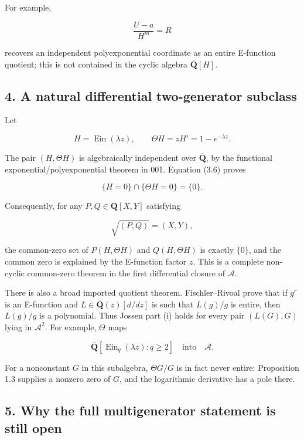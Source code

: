 \documentclass[11pt]{article}
\theoremstyle{keio}
\theoremstyle{definition}
\theoremstyle{remark}
\begin{document}
For example,

\[
  \frac{U-a}{H^m}=R
\]

recovers an independent polyexponential coordinate as an entire E-function
quotient; this is not contained in the cyclic algebra
\(\overline{\mathbf Q}[H]\).

\subsection{4. A natural differential two-generator subclass}

Let

\[
  H=\operatorname{Ein}(\lambda z),\qquad
  \Theta H=zH'=1-e^{-\lambda z}.
\]

The pair \((H,\Theta H)\) is algebraically independent over
\(\overline{\mathbf Q}\), by the functional exponential/polyexponential
theorem in 001. Equation (3.6) proves

\[
  \{H=0\}\cap\{\Theta H=0\}=\{0\}.                          \tag{J-4.1}
\]

Consequently, for any \(P,Q\in\overline{\mathbf Q}[X,Y]\) satisfying

\[
  \sqrt{(P,Q)}=(X,Y),                                       \tag{J-4.2}
\]

the common-zero set of \(P(H,\Theta H)\) and
\(Q(H,\Theta H)\) is exactly \(\{0\}\), and the common zero is explained by
the E-function factor \(z\). This is a complete non-cyclic common-zero
theorem in the first differential closure of \(\mathscr A\).

There is also a broad imported quotient theorem. Fischler--Rivoal prove that
if \(g^r\) is an E-function and \(L\in\overline{\mathbf Q}(z)[d/dz]\) is such
that \(L(g)/g\) is entire, then \(L(g)/g\) is a polynomial. Thus Jossen part
(i) holds for every pair \((L(G),G)\) lying in \(\mathscr A^2\). For example,
\(\Theta\) maps

\[
 \overline{\mathbf Q}[\operatorname{Ein}_q(\lambda z):q\ge2]
 \quad\text{into}\quad\mathscr A.
\]

For a nonconstant \(G\) in this subalgebra, \(\Theta G/G\) is in fact never
entire: Proposition 1.3 supplies a nonzero zero of \(G\), and the logarithmic
derivative has a pole there.

\subsection{5. Why the full multigenerator statement is still open}
\end{document}

